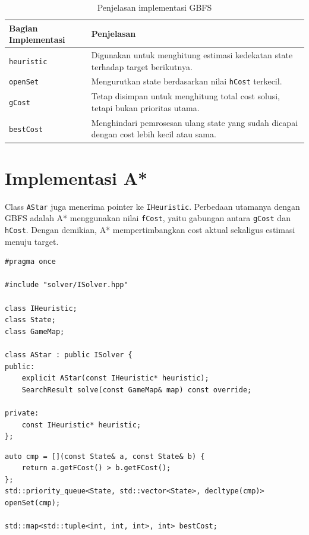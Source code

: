 \begin{table}[H]
	\centering
	\caption{Penjelasan implementasi GBFS}
	\begin{tabular}{|p{4cm}|p{10cm}|}
		\hline
		\rowcolor{orange!20}
		\textbf{Bagian Implementasi} & \textbf{Penjelasan} \\
		\hline
		\texttt{heuristic} & Digunakan untuk menghitung estimasi kedekatan state terhadap target berikutnya. \\
		\hline
		\texttt{openSet} & Mengurutkan state berdasarkan nilai \texttt{hCost} terkecil. \\
		\hline
		\texttt{gCost} & Tetap disimpan untuk menghitung total cost solusi, tetapi bukan prioritas utama. \\
		\hline
		\texttt{bestCost} & Menghindari pemrosesan ulang state yang sudah dicapai dengan cost lebih kecil atau sama. \\
		\hline
	\end{tabular}
\end{table}

\section{Implementasi A*}

Class \texttt{AStar} juga menerima pointer ke \texttt{IHeuristic}. 
Perbedaan utamanya dengan GBFS adalah A* menggunakan nilai \texttt{fCost}, yaitu gabungan antara \texttt{gCost} dan \texttt{hCost}. 
Dengan demikian, A* mempertimbangkan cost aktual sekaligus estimasi menuju target.

\begin{tcolorbox}[
	colback=red!5,
	colframe=red!60!black,
	title=\textbf{Potongan Source Code Asli: Deklarasi \texttt{AStar.hpp}},
	arc=2mm,
	boxrule=0.8pt
]
\small
\begin{verbatim}
#pragma once

#include "solver/ISolver.hpp"

class IHeuristic;
class State;
class GameMap;

class AStar : public ISolver {
public:
    explicit AStar(const IHeuristic* heuristic);
    SearchResult solve(const GameMap& map) const override;

private:
    const IHeuristic* heuristic;
};
\end{verbatim}
\end{tcolorbox}

\begin{tcolorbox}[
	colback=red!5,
	colframe=red!60!black,
	title=\textbf{Potongan Source Code Asli: Prioritas A*},
	arc=2mm,
	boxrule=0.8pt
]
\small
\begin{verbatim}
auto cmp = [](const State& a, const State& b) {
    return a.getFCost() > b.getFCost();
};
std::priority_queue<State, std::vector<State>, decltype(cmp)> openSet(cmp);

std::map<std::tuple<int, int, int>, int> bestCost;
\end{verbatim}
\end{tcolorbox}

